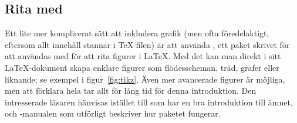 \documentclass[../../a4.tex]{subfiles}
\begin{document}
\subsection{Rita med \PGFTikZ}
Ett lite mer komplicerat sätt att inkludera grafik (men ofta 
föredelaktigt, eftersom allt innehåll stannar i \TeX-filen) är att använda
\PGFTikZ, ett paket skrivet för att användas med \pdfLaTeX{} för att rita
figurer i \LaTeX{}. Med det kan man direkt i sitt \LaTeX-dokument skapa
enklare figurer som flödesscheman, träd, grafer eller liknande; se exempel
i figur~\vref{fig:tikz}. Även mer avancerade figurer är möjliga, men att
förklara hela \PGFTikZ{} tar allt för lång tid för denna introduktion. Den
intresserade läsaren hänvisas istället till  som har
en bra introduktion till ämnet, och \PGFTikZ-manualen \cite{Tantau10} som
utförligt beskriver hur paketet fungerar.
\end{document}

